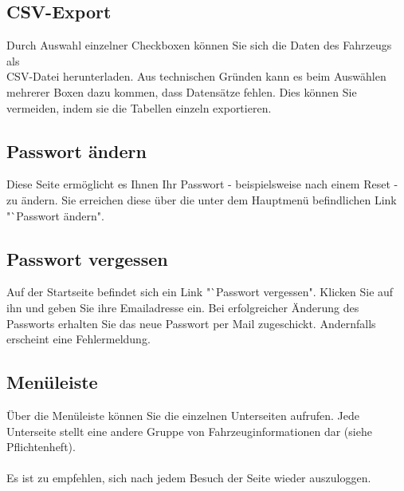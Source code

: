 \documentclass[fontsize = 12pt, paper = a4]{scrreprt}
\begin{document}
\subsection{CSV-Export}

Durch Auswahl einzelner Checkboxen können Sie sich die Daten des Fahrzeugs als \\ CSV-Datei herunterladen. Aus technischen Gründen kann es beim Auswählen mehrerer Boxen dazu kommen, dass Datensätze fehlen. Dies können Sie vermeiden, indem sie die Tabellen einzeln exportieren.

\subsection{Passwort ändern}

Diese Seite ermöglicht es Ihnen Ihr Passwort - beispielsweise nach einem Reset - zu ändern. Sie erreichen diese über die unter dem Hauptmenü befindlichen Link "`Passwort ändern".

\subsection{Passwort vergessen}

Auf der Startseite befindet sich ein Link "`Passwort vergessen". Klicken Sie auf ihn und geben Sie ihre Emailadresse ein. Bei erfolgreicher Änderung des Passworts erhalten Sie das neue Passwort per Mail zugeschickt. Andernfalls erscheint eine Fehlermeldung.

\subsection{Menüleiste}

Über die Menüleiste können Sie die einzelnen Unterseiten aufrufen. Jede Unterseite stellt eine andere Gruppe von Fahrzeuginformationen dar (siehe Pflichtenheft). \\ \\

Es ist zu empfehlen, sich nach jedem Besuch der Seite wieder auszuloggen.



\listoffigures

\end{document}
